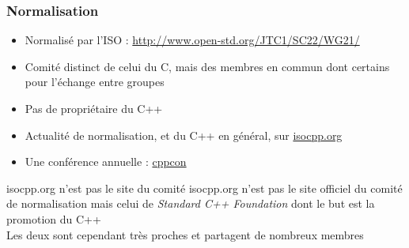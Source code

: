 \documentclass[C++.tex]{subfiles}
\begin{document}
\begin{frame}
	\frametitle{Normalisation}
	\begin{itemize}
		\item Normalisé par l'ISO : \url{http://www.open-std.org/JTC1/SC22/WG21/}


		\item Comité distinct de celui du C, mais des membres en commun dont certains pour l'échange entre groupes


		\item Pas de propriétaire du C++


		\item Actualité de normalisation, et du C++ en général, sur \href{https://isocpp.org/}{isocpp.org}


		\item Une conférence annuelle : \href{http://cppcon.org/}{cppcon}

	\end{itemize}

	\begin{alertblock}{isocpp.org n'est pas le site du comité}
		isocpp.org n'est pas le site officiel du comité de normalisation mais celui de \textit{Standard C++ Foundation} dont le but est la promotion du C++\\
		Les deux sont cependant très proches et partagent de nombreux membres

	\end{alertblock}
\end{frame}
\end{document}
